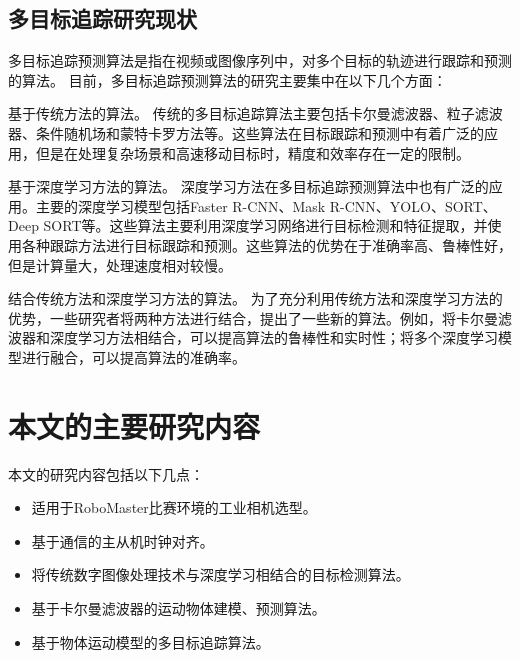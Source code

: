 \subsection{多目标追踪研究现状}
多目标追踪预测算法是指在视频或图像序列中，对多个目标的轨迹进行跟踪和预测的算法。
目前，多目标追踪预测算法的研究主要集中在以下几个方面：
\par
基于传统方法的算法。
传统的多目标追踪算法主要包括卡尔曼滤波器、粒子滤波器、条件随机场和蒙特卡罗方法等。这些算法在目标跟踪和预测中有着广泛的应用，但是在处理复杂场景和高速移动目标时，精度和效率存在一定的限制。
\par
基于深度学习方法的算法。
深度学习方法在多目标追踪预测算法中也有广泛的应用。主要的深度学习模型包括Faster R-CNN、Mask R-CNN、YOLO、SORT、Deep SORT等。这些算法主要利用深度学习网络进行目标检测和特征提取，并使用各种跟踪方法进行目标跟踪和预测。这些算法的优势在于准确率高、鲁棒性好，但是计算量大，处理速度相对较慢。
\par
结合传统方法和深度学习方法的算法。
为了充分利用传统方法和深度学习方法的优势，一些研究者将两种方法进行结合，提出了一些新的算法。例如，将卡尔曼滤波器和深度学习方法相结合，可以提高算法的鲁棒性和实时性；将多个深度学习模型进行融合，可以提高算法的准确率。


\section{本文的主要研究内容}
本文的研究内容包括以下几点：
\begin{itemize}[itemindent=2em]
    \item 适用于RoboMaster比赛环境的工业相机选型。
    \item 基于通信的主从机时钟对齐。
    \item 将传统数字图像处理技术与深度学习相结合的目标检测算法。
    \item 基于卡尔曼滤波器的运动物体建模、预测算法。
    \item 基于物体运动模型的多目标追踪算法。
\end{itemize}





